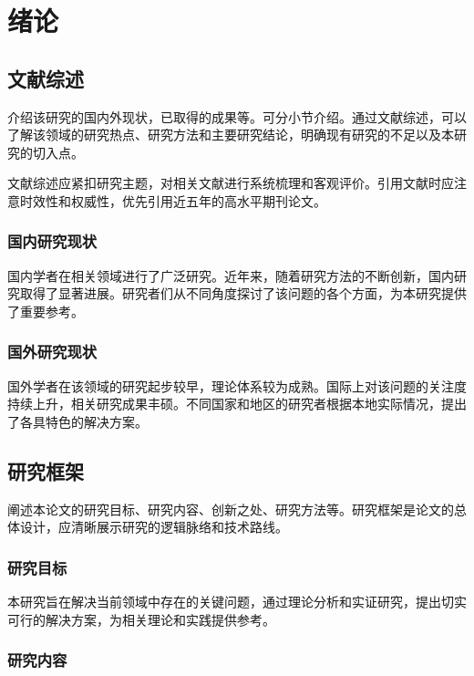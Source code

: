 
\chapter{绪论}

\section{文献综述}

介绍该研究的国内外现状，已取得的成果等。可分小节介绍。通过文献综述，可以了解该领域的研究热点、研究方法和主要研究结论，明确现有研究的不足以及本研究的切入点。

文献综述应紧扣研究主题，对相关文献进行系统梳理和客观评价。引用文献时应注意时效性和权威性，优先引用近五年的高水平期刊论文。

\subsection{国内研究现状}

国内学者在相关领域进行了广泛研究。近年来，随着研究方法的不断创新，国内研究取得了显著进展。研究者们从不同角度探讨了该问题的各个方面，为本研究提供了重要参考。

\subsection{国外研究现状}

国外学者在该领域的研究起步较早，理论体系较为成熟。国际上对该问题的关注度持续上升，相关研究成果丰硕。不同国家和地区的研究者根据本地实际情况，提出了各具特色的解决方案。

\section{研究框架}

阐述本论文的研究目标、研究内容、创新之处、研究方法等。研究框架是论文的总体设计，应清晰展示研究的逻辑脉络和技术路线。

\subsection{研究目标}

本研究旨在解决当前领域中存在的关键问题，通过理论分析和实证研究，提出切实可行的解决方案，为相关理论和实践提供参考。

\subsection{研究内容}

